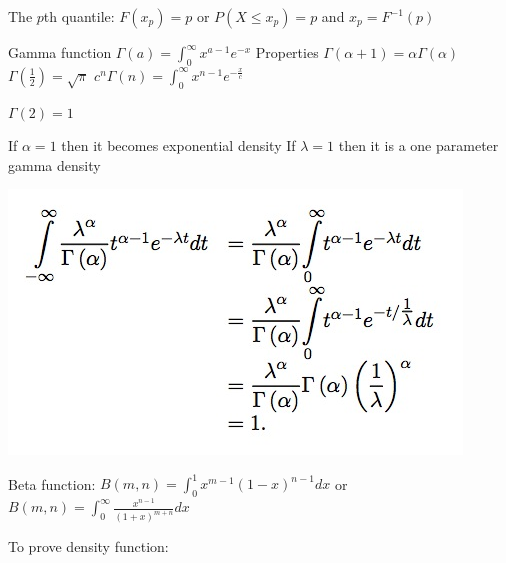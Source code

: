 \documentclass{/out/app/latex/examnotes}
\begin{document}
{The $p$th quantile: $F(x_p)=p$ \quad or $P(X\le x_p)=p$ \quad and $x_p=F^{-1}(p)$



Gamma function $\Gamma(a)=\displaystyle\int_0^\infty{x^{a-1}e^{-x}}$ \quad Properties $\Gamma(\alpha+1)=\alpha\Gamma(\alpha)$ \quad $\Gamma(\frac{1}{2})=\sqrt{\pi}$
\quad $c^n\Gamma(n)=\displaystyle\int_0^\infty{x^{n-1}e^{-\displaystyle\frac{x}{c}}}$

$\Gamma(2) = 1$ \vspace{6pt}

If $\alpha=1$ then it becomes exponential density
If $\lambda=1$ then it is a one parameter gamma density

\includegraphics[scale=0.4]{./img/2gam.jpg}



Beta function: $B(m,n)=\displaystyle\int_0^1{x^{m-1}(1-x)^{n-1}dx}$ \quad or $B(m,n)=\displaystyle\int_0^\infty{\frac{x^{n-1}}{(1+x)^{m+n}}dx}$

To prove density function:

}
\end{document}

